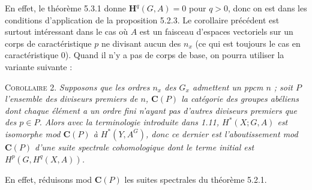 En effet, le théorème 5.3.1 donne $\mathbf H^q(G,A)=0$ pour $q>0$, donc on est
dans les conditions d'application de la proposition 5.2.3. Le corollaire
précédent est surtout intéressant dans le cas où $A$ est un faisceau d'espaces
vectoriels sur un corps de caractéristique $p$ ne divisant aucun des $n_x$
(ce qui est toujours le cas en caractéristique 0). Quand il n'y a pas de corps
de base, on pourra utiliser la variante suivante :

\textsc{Corollaire 2.} \textit{Supposons que les ordres $n_x$ des
$G_x$ admettent un ppcm $n$ ; soit $P$ l'ensemble des diviseurs premiers de
$n$, ${\mathbf C}(P)$ la catégorie des groupes abéliens dont chaque élément a un ordre
fini n'ayant pas d'autres diviseurs premiers que des $p\in P$. Alors avec la
terminologie introduite dans \textup{1.11}, $H^*(X;G,A)$ est isomorphe mod ${\mathbf C}(P)$ à
$H^*(Y,A^G)$, donc ce dernier est l'aboutissement mod ${\mathbf C}(P)$ d'une suite
spectrale cohomologique dont le terme initial est $H^p(G,H^q(X,A))$.}

En effet, réduisons mod ${\mathbf C}(P)$ les suites spectrales du théorème 5.2.1.

